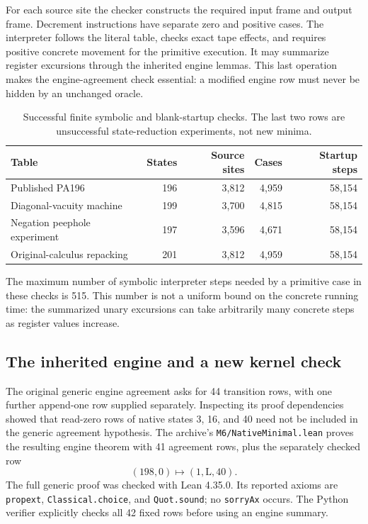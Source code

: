 For each source site the checker constructs the required input frame and output frame. Decrement instructions have separate zero and positive cases. The interpreter follows the literal table, checks exact tape effects, and requires positive concrete movement for the primitive execution. It may summarize register excursions through the inherited engine lemmas. This last operation makes the engine-agreement check essential: a modified engine row must never be hidden by an unchanged oracle.

\begin{table}[ht]
\centering
\begin{tabular}{@{}lrrrr@{}}
\toprule
Table & States & Source sites & Cases & Startup steps\\
\midrule
Published PA196 &196&3,812&4,959&58,154\\
Diagonal-vacuity machine &199&3,700&4,815&58,154\\
Negation peephole experiment &197&3,596&4,671&58,154\\
Original-calculus repacking &201&3,812&4,959&58,154\\
\bottomrule
\end{tabular}
\caption{Successful finite symbolic and blank-startup checks. The last two rows are unsuccessful state-reduction experiments, not new minima.}
\end{table}

The maximum number of symbolic interpreter steps needed by a primitive case in these checks is 515. This number is not a uniform bound on the concrete running time: the summarized unary excursions can take arbitrarily many concrete steps as register values increase.

\subsection{The inherited engine and a new kernel check}
The original generic engine agreement asks for 44 transition rows, with one further append-one row supplied separately. Inspecting its proof dependencies showed that read-zero rows of native states 3, 16, and 40 need not be included in the generic agreement hypothesis. The archive's \texttt{M6/NativeMinimal.lean} proves the resulting engine theorem with 41 agreement rows, plus the separately checked row
\[
 (198,0)\longmapsto(1,\mathrm L,40).
\]
The full generic proof was checked with Lean 4.35.0. Its reported axioms are \texttt{propext}, \texttt{Classical.choice}, and \texttt{Quot.sound}; no \texttt{sorryAx} occurs. The Python verifier explicitly checks all 42 fixed rows before using an engine summary.

